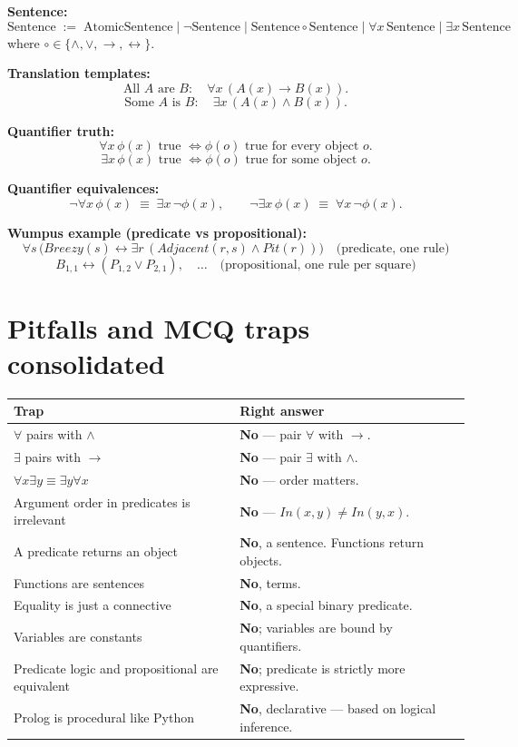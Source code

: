 \documentclass[11pt, a4paper]{article}
\newcommand{\thead}[1]{\textbf{#1}}
\begin{document}
\textbf{Sentence:}
\[
\text{Sentence} \;:=\; \text{AtomicSentence} \;|\; \neg\text{Sentence} \;|\; \text{Sentence} \circ \text{Sentence} \;|\; \forall x\,\text{Sentence} \;|\; \exists x\,\text{Sentence}
\]
where $\circ \in \{\land, \lor, \rightarrow, \leftrightarrow\}$.

\textbf{Translation templates:}
\[
\text{All } A \text{ are } B: \quad \forall x\,(A(x) \rightarrow B(x)).
\]
\[
\text{Some } A \text{ is } B: \quad \exists x\,(A(x) \land B(x)).
\]

\textbf{Quantifier truth:}
\[
\forall x\,\phi(x) \text{ true } \iff \phi(o) \text{ true for every object } o.
\]
\[
\exists x\,\phi(x) \text{ true } \iff \phi(o) \text{ true for some object } o.
\]

\textbf{Quantifier equivalences:}
\[
\neg \forall x \, \phi(x) \;\equiv\; \exists x \, \neg \phi(x), \qquad \neg \exists x \, \phi(x) \;\equiv\; \forall x \, \neg \phi(x).
\]

\textbf{Wumpus example (predicate vs propositional):}
\[
\forall s\,\bigl(Breezy(s) \leftrightarrow \exists r\,(Adjacent(r, s) \land Pit(r))\bigr) \quad \text{(predicate, one rule)}
\]
\[
B_{1,1} \leftrightarrow (P_{1,2} \lor P_{2,1}), \quad \dots \quad \text{(propositional, one rule per square)}
\]

\section*{Pitfalls and MCQ traps consolidated}

\begin{trapbox}[summary]
\begin{tabular}{@{}p{6.5cm}p{8cm}@{}}
\toprule
\thead{Trap} & \thead{Right answer} \\
\midrule
$\forall$ pairs with $\land$            & \textbf{No} — pair $\forall$ with $\rightarrow$. \\
$\exists$ pairs with $\rightarrow$      & \textbf{No} — pair $\exists$ with $\land$. \\
$\forall x \exists y \equiv \exists y \forall x$ & \textbf{No} — order matters. \\
Argument order in predicates is irrelevant & \textbf{No} — $In(x, y) \neq In(y, x)$. \\
A predicate returns an object           & \textbf{No}, a sentence. Functions return objects. \\
Functions are sentences                  & \textbf{No}, terms. \\
Equality is just a connective            & \textbf{No}, a special binary predicate. \\
Variables are constants                  & \textbf{No}; variables are bound by quantifiers. \\
Predicate logic and propositional are equivalent & \textbf{No}; predicate is strictly more expressive. \\
Prolog is procedural like Python         & \textbf{No}, declarative — based on logical inference. \\
\bottomrule
\end{tabular}
\end{trapbox}
\end{document}
